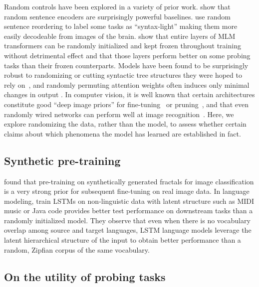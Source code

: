 \documentclass[letterpaper, 12pt]{report}
\begin{document}
Random controls have been explored in a variety of prior work.
\citet{wietingkiela2019} show that random sentence encoders are surprisingly powerful baselines.  \citet{gauthier-levy-2019-linking} use random sentence reordering to label some tasks as ``syntax-light'' making them more easily decodeable from images of the brain.
\citet{shen2020a} show that entire layers of MLM transformers can be randomly initialized and kept frozen throughout training without detrimental effect and that those layers perform better on some probing tasks than their frozen counterparts.
Models have been found to be surprisingly robust to randomizing or cutting syntactic tree structures they were hoped to rely on~\cite{scheible2013cutting,williams2018latent}, and randomly permuting attention weights often induces only minimal changes in output \cite{jain-wallace-2019-attention}. In computer vision, it is well known that certain architectures constitute good ``deep image priors'' for fine-tuning~\cite{ulyanov2018deep} or pruning~\cite{frankle2020training}, and that even randomly wired networks can perform well at image recognition~\cite{xie2019exploring}. Here, we explore randomizing the data, rather than the model, to assess whether certain claims about which phenomena the model has learned are established in fact.


\subsection{Synthetic pre-training}

\citet{kataoka2021} found that pre-training on synthetically generated fractals for image classification is a very strong prior for subsequent fine-tuning on real image data. In language modeling, \citet{papadimitriou-jurafsky-2020-learning} train LSTMs \citep{hochreiter1997long} on non-linguistic data with latent structure such as MIDI music or Java code provides better test performance on downstream tasks than a randomly initialized model. They observe that even when there is no vocabulary overlap among source and target languages, LSTM language models leverage the latent hierarchical structure of the input to obtain better performance than a random, Zipfian corpus of the same vocabulary.


\subsection{On the utility of probing tasks}
\end{document}
